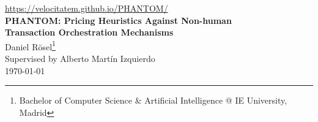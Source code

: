 \documentclass[10pt,letterpaper]{article}
\begin{document}
\singlespacing
\setlength{\parskip}{0.35em}
\setlength{\parindent}{0pt}
\small
\fancyhead[L]{}

\begin{center}
  {\small\url{https://velocitatem.github.io/PHANTOM/}}\\[0.65em]
  {\large\bfseries PHANTOM: Pricing Heuristics Against Non-human\\[0.15em] Transaction Orchestration Mechanisms}\\[0.55em]
  {\normalsize Daniel Rösel\footnote{Bachelor of Computer Science \& Artificial Intelligence @ IE University, Madrid}}\\[0.55em]
  {\small Supervised by Alberto Martín Izquierdo}\\[0.35em]
  {\small \today}
\end{center}

\vspace{0.75em}
\end{document}
